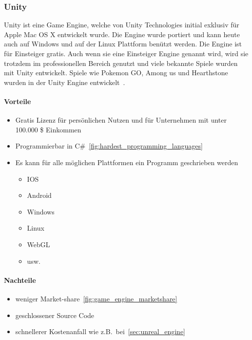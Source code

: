 \subsubsection{Unity}

Unity ist eine Game Engine, welche von Unity Technologies initial exklusiv für Apple Mac OS X entwickelt wurde.
Die Engine wurde portiert und kann heute auch auf Windows und auf der Linux Plattform benützt werden.
Die Engine ist für Einsteiger gratis.
Auch wenn sie eine Einsteiger Engine genannt wird, wird sie trotzdem im professionellen Bereich genutzt und viele bekannte Spiele wurden mit Unity entwickelt.
Spiele wie Pokemon GO, Among us und Hearthstone wurden in der Unity Engine entwickelt~\cite{Haas2014AHO,UNITY_DOWNLOAD,UNITY_PRICING,WIKIPEDIA_UNITY_GAME_LIST_2014}.

\paragraph{Vorteile}

\begin{itemize}
    \item Gratis Lizenz für persönlichen Nutzen und für Unternehmen mit unter 100.000 \$ Einkommen~\cite{UNITY_PRICING}
    \item Programmierbar in C\#~\ref{fig:hardest_programming_languages}
    \item Es kann für alle möglichen Plattformen ein Programm geschrieben werden~\cite{UNITY_PLATTFORMS}
    \begin{itemize}
        \item IOS
        \item Android
        \item Windows
        \item Linux
        \item WebGL
        \item usw.
    \end{itemize}
\end{itemize}

\paragraph{Nachteile}

\begin{itemize}
    \item weniger Market-share~\ref{fig:game_engine_marketshare}
    \item geschlossener Source Code
    \item schnellerer Kostenanfall wie z.B.\ bei~\ref{sec:unreal_engine}
\end{itemize}

